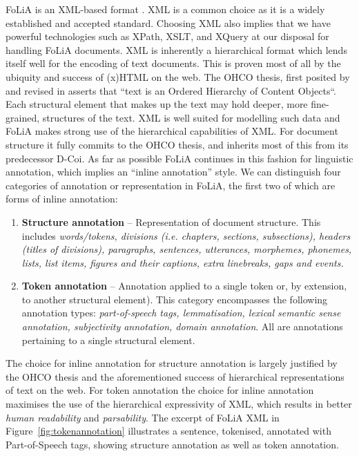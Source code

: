 \documentclass[a4paper,10pt,twoside]{article}
\begin{document}
FoLiA is an XML-based format \cite{XML}. XML is a common choice as it is a
widely established and accepted standard. Choosing XML also implies that we
have powerful technologies such as XPath, XSLT, and XQuery at our disposal for
handling FoLiA documents. XML is inherently a hierarchical format which lends
itself well for the encoding of text documents. This is proven most of all by
the ubiquity and success of (x)HTML on the web.  The OHCO thesis, first posited
by \cite{OHCO1} and revised in \cite{OHCO2} asserts that ``text is an Ordered
Hierarchy of Content Objects``. Each structural element that makes up the text
may hold deeper, more fine-grained, structures of the text. XML is well suited
for modelling such data and FoLiA makes strong use of the hierarchical
capabilities of XML. For document structure it fully commits to the OHCO
thesis, and inherits most of this from its predecessor D-Coi. As far as
possible FoLiA continues in this fashion for linguistic annotation, which
implies an ``inline annotation'' style. We can distinguish four categories of
annotation or representation in FoLiA, the first two of which are forms of
inline annotation:

\begin{enumerate}
\item \textbf{Structure annotation} -- Representation of document structure.
  This includes \emph{words/tokens, divisions (i.e. chapters, sections,
  subsections), headers (titles of divisions), paragraphs, sentences,
  utterances, morphemes,
  phonemes, lists,
  list items, figures and their captions, extra linebreaks, gaps and events.}
\item \textbf{Token annotation} -- Annotation applied to a single token or, by
  extension, to another structural element). This category encompasses the
  following annotation types: \emph{part-of-speech tags, lemmatisation, lexical
  semantic sense annotation, subjectivity annotation, domain annotation}. All
  are annotations pertaining to a single structural element.
  \setcounter{enumTemptwo}{\theenumi}
\end{enumerate}

The choice for inline annotation for structure annotation is largely justified
by the OHCO thesis and the aforementioned success of hierarchical representations of text on
the web. For token annotation the choice for inline annotation maximises the
use of the hierarchical expressivity of XML, which results in better \emph{human
readability} and \emph{parsability}. The excerpt of FoLiA XML in
Figure~\ref{fig:tokenannotation} illustrates a sentence, tokenised, annotated with
Part-of-Speech tags, showing structure annotation as well as token annotation.
\end{document}
